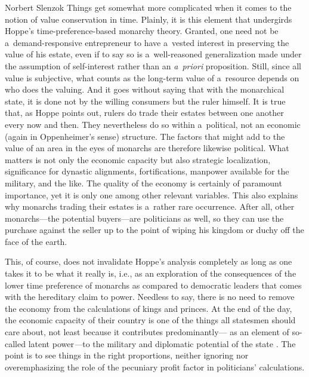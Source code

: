 \begin{artengenv}{Norbert Slenzok}
Things get somewhat more complicated when it comes to the notion of value conservation in time. Plainly, it is this element that undergirds Hoppe's time-preference-based monarchy theory. Granted, one need not be a~demand-responsive entrepreneur to have a~vested interest in preserving the value of his estate, even if to say so is a~well-reasoned generalization made under the assumption of self-interest rather than an \textit{a~priori} proposition. Still, since all value is subjective, what counts as the long-term value of a~resource depends on who does the valuing. And it goes without saying that with the monarchical state, it is done not by the willing consumers but the ruler himself. It is true that, as Hoppe 
\parencite*[][p.18]{hoppe_democracy_2007} %
 points out, rulers do trade their estates between one another every now and then. They nevertheless do so within a~political, not an economic (again in Oppenheimer's sense) structure. The factors that might add to the value of an area in the eyes of monarchs are therefore likewise political. What matters is not only the economic capacity but also strategic localization, significance for dynastic alignments, fortifications, manpower available for the military, and the like. The quality of the economy is certainly of paramount importance, yet it is only one among other relevant variables. This also explains why monarchs trading their estates is a~rather rare occurrence. After all, other monarchs---the potential buyers---are politicians as well, so they can use the purchase against the seller up to the point of wiping his kingdom or duchy off the face of the earth.



This, of course, does not invalidate Hoppe's analysis completely as long as one takes it to be what it really is, i.e., as an exploration of the consequences of the lower time preference of monarchs as compared to democratic leaders that comes with the hereditary claim to power. Needless to say, there is no need to remove the economy from the calculations of kings and princes. At the end of the day, the economic capacity of their country is one of the things all statesmen should care about, not least because it contributes predominantly--- as an element of so-called latent power\textit{---}to the military and diplomatic potential of the state 
\parencite[][chap. 3]{mearsheimer_tragedy_2001}. %
 The point is to see things in the right proportions, neither ignoring nor overemphasizing the role of the pecuniary profit factor in politicians' calculations.




\end{artengenv}
